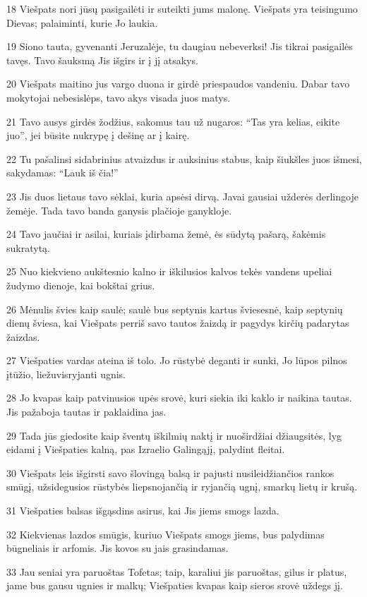 \par 18 Viešpats nori jūsų pasigailėti ir suteikti jums malonę. Viešpats yra teisingumo Dievas; palaiminti, kurie Jo laukia. 
\par 19 Siono tauta, gyvenanti Jeruzalėje, tu daugiau nebeverksi! Jis tikrai pasigailės tavęs. Tavo šauksmą Jis išgirs ir į jį atsakys. 
\par 20 Viešpats maitino jus vargo duona ir girdė priespaudos vandeniu. Dabar tavo mokytojai nebesislėps, tavo akys visada juos matys. 
\par 21 Tavo ausys girdės žodžius, sakomus tau už nugaros: “Tas yra kelias, eikite juo”, jei būsite nukrypę į dešinę ar į kairę. 
\par 22 Tu pašalinsi sidabrinius atvaizdus ir auksinius stabus, kaip šiukšles juos išmesi, sakydamas: “Lauk iš čia!” 
\par 23 Jis duos lietaus tavo sėklai, kuria apsėsi dirvą. Javai gausiai užderės derlingoje žemėje. Tada tavo banda ganysis plačioje ganykloje. 
\par 24 Tavo jaučiai ir asilai, kuriais įdirbama žemė, ės sūdytą pašarą, šakėmis sukratytą. 
\par 25 Nuo kiekvieno aukštesnio kalno ir iškilusios kalvos tekės vandens upeliai žudymo dienoje, kai bokštai grius. 
\par 26 Mėnulis švies kaip saulė; saulė bus septynis kartus šviesesnė, kaip septynių dienų šviesa, kai Viešpats perriš savo tautos žaizdą ir pagydys kirčių padarytas žaizdas. 
\par 27 Viešpaties vardas ateina iš tolo. Jo rūstybė deganti ir sunki, Jo lūpos pilnos įtūžio, liežuvis­ryjanti ugnis. 
\par 28 Jo kvapas kaip patvinusios upės srovė, kuri siekia iki kaklo ir naikina tautas. Jis pažaboja tautas ir paklaidina jas. 
\par 29 Tada jūs giedosite kaip šventų iškilmių naktį ir nuoširdžiai džiaugsitės, lyg eidami į Viešpaties kalną, pas Izraelio Galingąjį, palydint fleitai. 
\par 30 Viešpats leis išgirsti savo šlovingą balsą ir pajusti nusileidžiančios rankos smūgį, užsidegusios rūstybės liepsnojančią ir ryjančią ugnį, smarkų lietų ir krušą. 
\par 31 Viešpaties balsas išgąsdins asirus, kai Jis jiems smogs lazda. 
\par 32 Kiekvienas lazdos smūgis, kuriuo Viešpats smogs jiems, bus palydimas būgneliais ir arfomis. Jis kovos su jais grasindamas. 
\par 33 Jau seniai yra paruoštas Tofetas; taip, karaliui jis paruoštas, gilus ir platus, jame bus gausu ugnies ir malkų; Viešpaties kvapas kaip sieros srovė uždegs jį.




